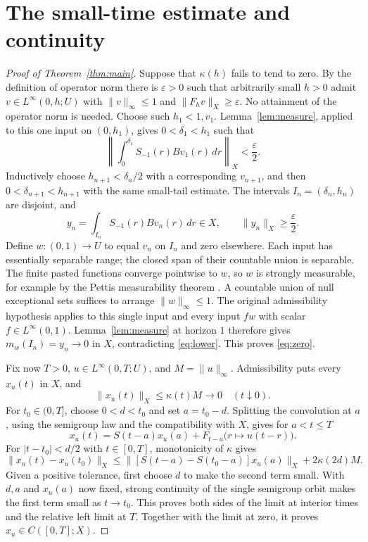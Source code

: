 \documentclass[11pt]{article}
\theoremstyle{remark}
\begin{document}
\section{The small-time estimate and continuity}

\begin{proof}[Proof of Theorem~\ref{thm:main}]
Suppose that \(\kappa(h)\) fails to tend to zero.
By the definition of operator norm there is \(\varepsilon>0\) such that
arbitrarily small \(h>0\) admit \(v\in L^\infty(0,h;U)\) with
\(\|v\|_\infty\le1\) and \(\|F_hv\|_X\ge\varepsilon\).
No attainment of the operator norm is needed.
Choose such \(h_1<1,v_1\).
Lemma~\ref{lem:measure}, applied to this one input on \((0,h_1)\),
gives \(0<\delta_1<h_1\) such that
\[
 \left\|\int_0^{\delta_1}S_{-1}(r)Bv_1(r)\,dr\right\|_X
       <\frac{\varepsilon}{2}.
\]
Inductively choose \(h_{n+1}<\delta_n/2\) with a corresponding \(v_{n+1}\),
and then \(0<\delta_{n+1}<h_{n+1}\) with the same small-tail estimate.
The intervals \(I_n=(\delta_n,h_n)\) are disjoint, and
\begin{equation}\label{eq:lower}
 y_n=\int_{I_n}S_{-1}(r)Bv_n(r)\,dr\in X,\qquad
 \|y_n\|_X\ge\frac{\varepsilon}{2}.
\end{equation}
Define \(w:(0,1)\to U\) to equal \(v_n\) on \(I_n\) and zero elsewhere.
Each input has essentially separable range; the closed span of their
countable union is separable. The finite pasted functions converge
pointwise to \(w\), so \(w\) is strongly measurable, for example by
the Pettis measurability theorem \cite[Chapter~IV, p.~25]{Diestel}.
A countable union of null exceptional sets suffices to arrange
\(\|w\|_\infty\le1\).
The original admissibility hypothesis applies to this single input and
every input \(fw\) with scalar \(f\in L^\infty(0,1)\).
Lemma~\ref{lem:measure} at horizon \(1\) therefore gives
\(m_w(I_n)=y_n\to0\) in \(X\), contradicting \eqref{eq:lower}.
This proves \eqref{eq:zero}.

Fix now \(T>0\), \(u\in L^\infty(0,T;U)\), and
\(M=\|u\|_\infty\). Admissibility puts every \(x_u(t)\) in \(X\), and
\[
 \|x_u(t)\|_X\le\kappa(t)M\longrightarrow0\quad(t\downarrow0).
\]
For \(t_0\in(0,T]\), choose \(0<d<t_0\) and set \(a=t_0-d\).
Splitting the convolution at \(a\), using the semigroup law and the
compatibility with \(X\), gives for \(a<t\le T\)
\[
 x_u(t)=S(t-a)x_u(a)
            +F_{t-a}\bigl(r\mapsto u(t-r)\bigr).
\]
For \(|t-t_0|<d/2\) with \(t\in[0,T]\), monotonicity of \(\kappa\) gives
\begin{equation}\label{eq:continuity}
 \|x_u(t)-x_u(t_0)\|_X
 \le \|[S(t-a)-S(t_0-a)]x_u(a)\|_X+2\kappa(2d)M .
\end{equation}
Given a positive tolerance, first choose \(d\) to make the second term
small. With \(d,a\) and \(x_u(a)\) now fixed, strong continuity of the
single semigroup orbit makes the first term small as \(t\to t_0\).
This proves both sides of the limit at interior times and the relative
left limit at \(T\). Together with the limit at zero, it proves
\(x_u\in C([0,T];X)\).
\end{proof}
\end{document}
